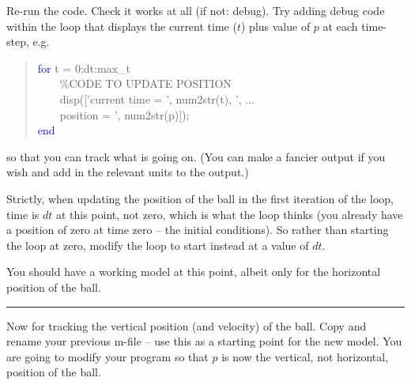 \documentclass{tufte-book} %
\newenvironment{docspecmargin}{\begin{quotation}\ttfamily\footnotesize\parskip0pt\parindent0pt\ignorespaces}{\end{quotation}}
\begin{document}
Re-run the code. Check it works at all (if not: debug). Try adding debug code within the loop that displays the current time (\(t\)) plus value of \(p\) at each time-step, e.g.
\begin{docspecmargin}
\textcolor{blue}{for} t = 0:dt:max\_t
\\ \ \ \ \ \textcolor[rgb]{0,0.501961,0}{\%CODE TO UPDATE POSITION}
\\ \ \ \ \ disp(['current time = ', num2str(t), ', ...
\\ \ \ \ \ position = ', num2str(p)]);
\\\textcolor{blue}{end}
\end{docspecmargin}
so that you can track what is going on. (You can make a fancier output if you wish and add in the relevant units to the output.)

Strictly, when updating the position of the ball in the first iteration of the loop, time is \(dt\) at this point, not zero, which is what the loop thinks (you already have a position of zero at time zero -- the initial conditions). So rather than starting the loop at zero,  modify the loop to start instead at a value of \(dt\).

You should have a working model at this point, albeit only for the horizontal position of the ball.

\vspace{1mm}
\noindent\rule{4cm}{0.5pt}
\vspace{-2mm}

\newpage
%
 Now for tracking the vertical position (and velocity) of the ball. Copy and rename your previous \textsf{m-file} -- use this as a starting point for the new model. You are going to modify your program so that \(p\) is now the vertical, not horizontal, position of the ball.
\end{document}
